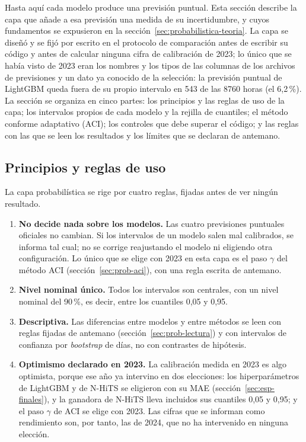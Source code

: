 Hasta aquí cada modelo produce una previsión puntual. Esta sección describe
la capa que añade a esa previsión una medida de su incertidumbre, y cuyos
fundamentos se expusieron en la sección~\ref{sec:probabilistica-teoria}. La
capa se diseñó y se fijó por escrito en el protocolo de comparación antes de
escribir su código y antes de calcular ninguna cifra de calibración de 2023;
lo único que se había visto de 2023 eran los nombres y los tipos de las
columnas de los archivos de previsiones y un dato ya conocido de la selección:
la previsión puntual de LightGBM queda fuera de su propio intervalo en 543 de
las 8760 horas (el 6,2\,\%). La sección se organiza en cinco
partes: los principios y las reglas de uso de la capa; los intervalos propios
de cada modelo y la rejilla de cuantiles; el método conforme adaptativo (ACI);
los controles que debe superar el código; y las reglas con las que se leen los
resultados y los límites que se declaran de antemano.

\subsection{Principios y reglas de uso}\label{sec:prob-principio}

La capa probabilística se rige por cuatro reglas, fijadas antes de ver
ningún resultado.

\begin{enumerate}
	\item \textbf{No decide nada sobre los modelos.} Las cuatro previsiones
	puntuales oficiales no cambian. Si los intervalos de un modelo salen mal
	calibrados, se informa tal cual; no se corrige reajustando el modelo ni
	eligiendo otra configuración. Lo único que se elige con 2023 en esta capa
	es el paso $\gamma$ del método ACI (sección~\ref{sec:prob-aci}), con una
	regla escrita de antemano.
	\item \textbf{Nivel nominal único.} Todos los intervalos son centrales, con
	un nivel nominal del 90\,\%, es decir, entre los cuantiles 0,05 y 0,95.
	\item \textbf{Descriptiva.} Las diferencias entre modelos y entre métodos
	se leen con reglas fijadas de antemano (sección~\ref{sec:prob-lectura}) y
	con intervalos de confianza por \textit{bootstrap} de días, no con
	contrastes de hipótesis.
	\item \textbf{Optimismo declarado en 2023.} La calibración medida en 2023
	es algo optimista, porque ese año ya intervino en dos elecciones: los
	hiperparámetros de LightGBM y de N-HiTS se eligieron con su MAE
	(sección~\ref{sec:esp-finales}), y la ganadora de N-HiTS lleva incluidos
	sus cuantiles 0,05 y 0,95; y el paso $\gamma$ de ACI se elige con 2023.
	Las cifras que se informan como rendimiento son, por tanto, las de 2024,
	que no ha intervenido en ninguna elección.
\end{enumerate}

